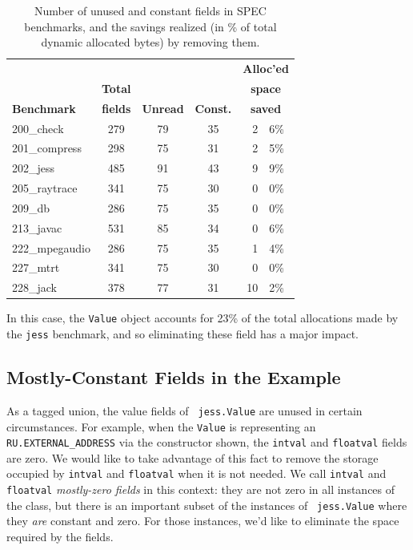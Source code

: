 \documentclass[preprint]{acmconf}
\begin{document}
\begin{table}
\begin{tabular}{lcccr@{.}l}
&&&&\multicolumn{2}{c}{\bf Alloc'ed}\\
&\bf Total&&&\multicolumn{2}{c}{\bf space}\\
\bf Benchmark &\bf fields &\bf Unread &\bf Const. &
\multicolumn{2}{c}{\bf saved} \\\hline
200\_check      & 279 &   79   &   35   &  2&6\% \\
201\_compress   & 298 &   75   &   31   &  2&5\% \\
202\_jess       & 485 &   91   &   43   &  9&9\% \\
205\_raytrace   & 341 &   75   &   30   &  0&0\% \\
209\_db         & 286 &   75   &   35   &  0&0\% \\
213\_javac      & 531 &   85   &   34   &  0&6\% \\
222\_mpegaudio  & 286 &   75   &   35   &  1&4\% \\
227\_mtrt       & 341 &   75   &   30   &  0&0\% \\
228\_jack       & 378 &   77   &   31   & 10&2\% \\
\end{tabular}
\caption{Number of unused and constant fields in SPEC benchmarks,
  and the savings realized (in \% of total dynamic allocated bytes) by
  removing them.}
\label{tab:const-unused}
\end{table}

In this case, the {\tt Value} object accounts for 23\% of the total
allocations made by the {\tt jess} benchmark, and so eliminating these
field has a major impact.

\subsection{Mostly-Constant Fields in the Example}
As a tagged union, the value fields of {\tt
  jess.Value} are unused in certain circumstances.  For example,
when the {\tt Value} is representing an {\tt RU.EXTERNAL\_ADDRESS}
via the constructor shown, the {\tt intval} and {\tt floatval} fields
are zero.  We would like to take advantage of this fact to remove
the storage occupied by {\tt intval} and {\tt floatval} when it is
not needed.  We call {\tt intval} and {\tt floatval} {\it mostly-zero
  fields} in this context: they are not zero in all instances of the
class, but there is an important subset of the instances of {\tt
  jess.Value} where they {\it are} constant and zero.  For those
instances, we'd like to eliminate the space required by the fields.
\end{document}
